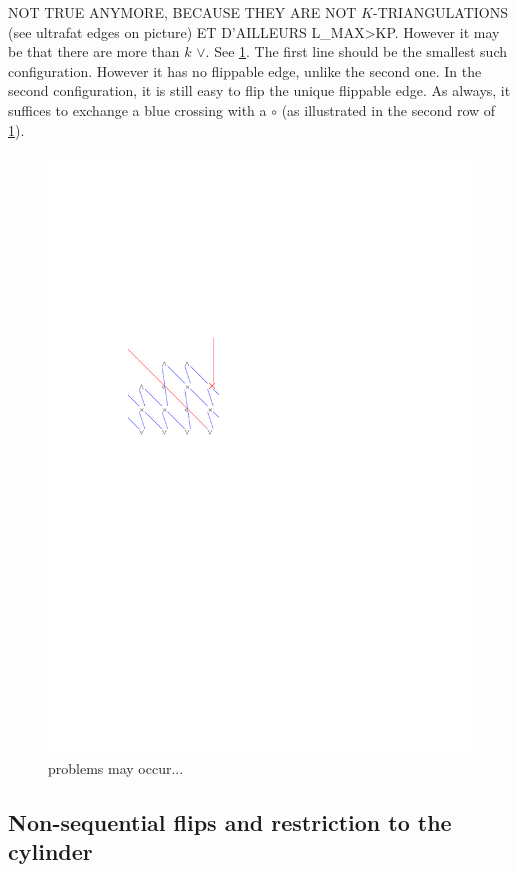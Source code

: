 \documentclass{amsart}
\theoremstyle{remark}
\begin{document}
\medskip

NOT TRUE ANYMORE, BECAUSE THEY ARE NOT $K$-TRIANGULATIONS (see ultrafat edges on picture) ET D'AILLEURS L_MAX>KP.
However it may be that there are more than $k$ $\vee$. See \cref{fig:problem}. The first line should be the smallest such configuration. However it has no flippable edge, unlike the second one. In the second configuration, it is still easy to flip the unique flippable edge. As always, it suffices to exchange a blue crossing with a $\circ$ (as illustrated in the second row of \cref{fig:problem}). 

\begin{figure}\label{fig:problem}
\includegraphics[width=.98\linewidth,page=2]{latticeRepresentation}
\caption{problems may occur...}
\end{figure}


\subsection{Non-sequential flips and restriction to the cylinder}
\end{document}
